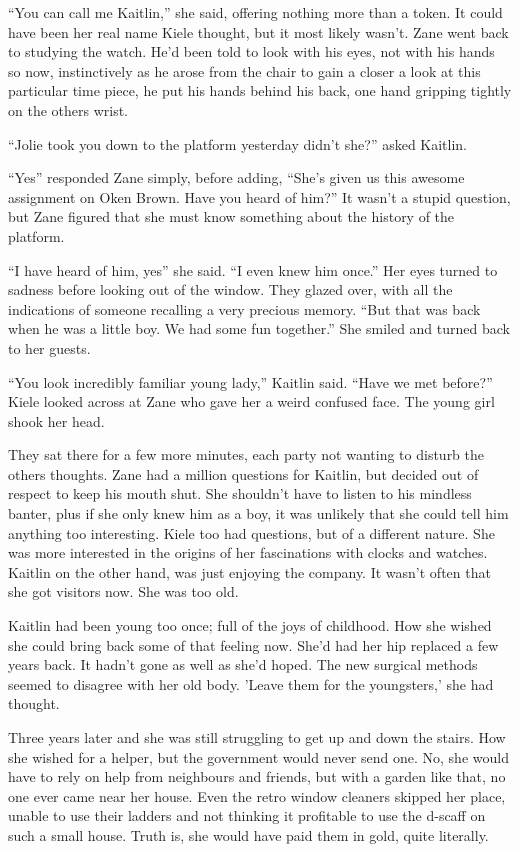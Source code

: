 ``You can call me Kaitlin,'' she said, offering nothing more than a token.  It could have been her real name Kiele thought, but it most likely wasn't.  Zane went back to studying the watch.  He'd been told to look with his eyes, not with his hands so now, instinctively as he arose from the chair to gain a closer a look at this particular time piece, he put his hands behind his back, one hand gripping tightly on the others wrist.  

``Jolie took you down to the platform yesterday didn't she?'' asked Kaitlin.  

``Yes'' responded Zane simply, before adding, ``She's given us this awesome assignment on Oken Brown.  Have you heard of him?''  It wasn't a stupid question, but Zane figured that she must know something about the history of the platform.

``I have heard of him, yes'' she said.  ``I even knew him once.''  Her eyes turned to sadness before looking out of the window.  They glazed over, with all the indications of someone recalling a very precious memory.  ``But that was back when he was a little boy.  We had some fun together.''  She smiled and turned back to her guests.  

``You look incredibly familiar young lady,'' Kaitlin said.  ``Have we met before?''  Kiele looked across at Zane who gave her a weird confused face.  The young girl shook her head.

They sat there for a few more minutes, each party not wanting to disturb the others thoughts.  Zane had a million questions for Kaitlin, but decided out of respect to keep his mouth shut.  She shouldn't have to listen to his mindless banter, plus if she only knew him as a boy, it was unlikely that she could tell him anything too interesting.  Kiele too had questions, but of a different nature.  She was more interested in the origins of her fascinations with clocks and watches.  Kaitlin on the other hand, was just enjoying the company.  It wasn't often that she got visitors now.  She was too old.  

Kaitlin had been young too once; full of the joys of childhood.  How she wished she could bring back some of that feeling now.  She'd had her hip replaced a few years back.  It hadn't gone as well as she'd hoped.  The new surgical methods seemed to disagree with her old body.  'Leave them for the youngsters,' she had thought.

Three years later and she was still struggling to get up and down the stairs.  How she wished for a helper, but the government would never send one.  No, she would have to rely on help from neighbours and friends, but with a garden like that, no one ever came near her house.  Even the retro window cleaners skipped her place, unable to use their ladders and not thinking it profitable to use the d-scaff on such a small house.  Truth is, she would have paid them in gold, quite literally.

